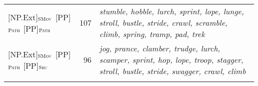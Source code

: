 \documentclass[output=paper,colorlinks,citecolor=brown]{langscibook}
\begin{document}
\begin{table}
\begin{tabularx}{\textwidth}{lrQ}
{[NP.Ext]}$_{\text{\textsc{SMov}}}$ {[PP]}$_{\text{\textsc{Path}}}$ {[PP]}$_{\text{\textsc{Path}}}$  & 107 & \textit{stumble, hobble, lurch, sprint, lope, lunge, stroll, bustle, stride, crawl, scramble, climb, spring, tramp, pad, trek%
}\\
%
{[NP.Ext]}$_{\text{\textsc{SMov}}}$ {[PP]}$_{\text{\textsc{Path}}}$ {[PP]}$_{\text{\textsc{Src}}}$  & 96 & \textit{jog, prance, clamber, trudge, lurch, scamper, sprint, hop, lope, troop, stagger, stroll, bustle, stride, swagger, crawl, climb%
%
}\\ 
\lspbottomrule

\end{tabularx}
\end{table}
\end{document}
